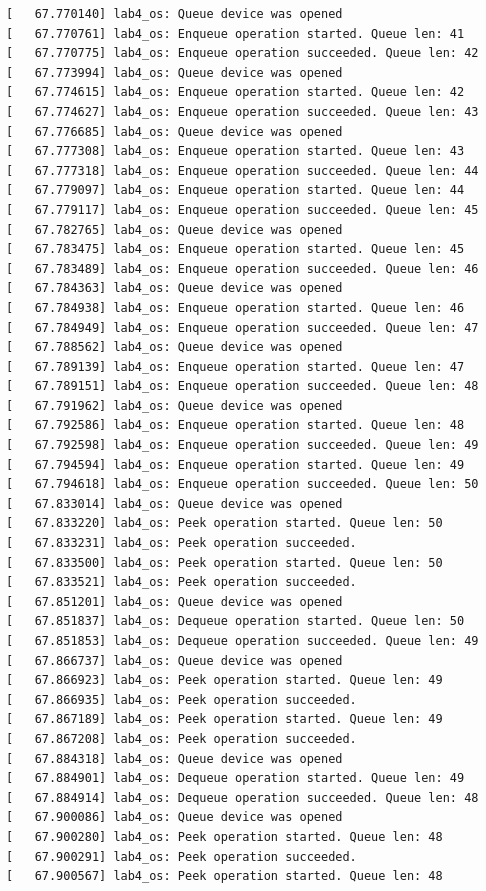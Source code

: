 \documentclass[a4paper,14pt]{extarticle}
\begin{document}
\begin{verbatim}
[   67.770140] lab4_os: Queue device was opened
[   67.770761] lab4_os: Enqueue operation started. Queue len: 41
[   67.770775] lab4_os: Enqueue operation succeeded. Queue len: 42
[   67.773994] lab4_os: Queue device was opened
[   67.774615] lab4_os: Enqueue operation started. Queue len: 42
[   67.774627] lab4_os: Enqueue operation succeeded. Queue len: 43
[   67.776685] lab4_os: Queue device was opened
[   67.777308] lab4_os: Enqueue operation started. Queue len: 43
[   67.777318] lab4_os: Enqueue operation succeeded. Queue len: 44
[   67.779097] lab4_os: Enqueue operation started. Queue len: 44
[   67.779117] lab4_os: Enqueue operation succeeded. Queue len: 45
[   67.782765] lab4_os: Queue device was opened
[   67.783475] lab4_os: Enqueue operation started. Queue len: 45
[   67.783489] lab4_os: Enqueue operation succeeded. Queue len: 46
[   67.784363] lab4_os: Queue device was opened
[   67.784938] lab4_os: Enqueue operation started. Queue len: 46
[   67.784949] lab4_os: Enqueue operation succeeded. Queue len: 47
[   67.788562] lab4_os: Queue device was opened
[   67.789139] lab4_os: Enqueue operation started. Queue len: 47
[   67.789151] lab4_os: Enqueue operation succeeded. Queue len: 48
[   67.791962] lab4_os: Queue device was opened
[   67.792586] lab4_os: Enqueue operation started. Queue len: 48
[   67.792598] lab4_os: Enqueue operation succeeded. Queue len: 49
[   67.794594] lab4_os: Enqueue operation started. Queue len: 49
[   67.794618] lab4_os: Enqueue operation succeeded. Queue len: 50
[   67.833014] lab4_os: Queue device was opened
[   67.833220] lab4_os: Peek operation started. Queue len: 50
[   67.833231] lab4_os: Peek operation succeeded.
[   67.833500] lab4_os: Peek operation started. Queue len: 50
[   67.833521] lab4_os: Peek operation succeeded.
[   67.851201] lab4_os: Queue device was opened
[   67.851837] lab4_os: Dequeue operation started. Queue len: 50
[   67.851853] lab4_os: Dequeue operation succeeded. Queue len: 49
[   67.866737] lab4_os: Queue device was opened
[   67.866923] lab4_os: Peek operation started. Queue len: 49
[   67.866935] lab4_os: Peek operation succeeded.
[   67.867189] lab4_os: Peek operation started. Queue len: 49
[   67.867208] lab4_os: Peek operation succeeded.
[   67.884318] lab4_os: Queue device was opened
[   67.884901] lab4_os: Dequeue operation started. Queue len: 49
[   67.884914] lab4_os: Dequeue operation succeeded. Queue len: 48
[   67.900086] lab4_os: Queue device was opened
[   67.900280] lab4_os: Peek operation started. Queue len: 48
[   67.900291] lab4_os: Peek operation succeeded.
[   67.900567] lab4_os: Peek operation started. Queue len: 48

\end{verbatim}
\end{document}
